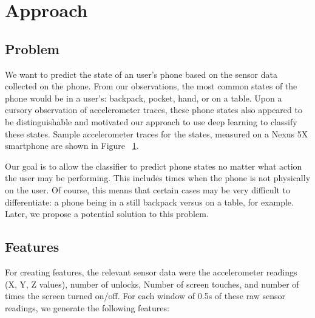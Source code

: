\section{Approach}

\subsection{Problem}
We want to predict the state of an user's phone based on the sensor data collected on the phone. 
From our observations, the most common states of the phone would be in a user's: backpack, pocket, hand, or on a table.
Upon a cursory observation of accelerometer traces, these phone states also appeared to be distinguishable and motivated
our approach to use deep learning to classify these states.
Sample accelerometer traces for the states, measured on a Nexus 5X
smartphone are shown in Figure ~\ref{fig:AccelDiffStates}.

\begin{figure}
\begin{center}
 \scalebox{0.375}{}
  \scalebox{0.375}{}
  \scalebox{0.375}{}
  \scalebox{0.375}{}
  \label{fig:AccelDiffStates}
\end{center}
\end{figure}


Our goal is to allow the classifier to predict phone states no matter what action the user may be performing.
This includes times when the phone is not physically on the user. 
Of course, this means that certain cases may be very difficult to differentiate: a phone being in a still backpack versus on a table, for example.
Later, we propose a potential solution to this problem. 


\subsection{Features}
For creating features, the relevant sensor data were the accelerometer readings (X, Y, Z values), number of unlocks, Number of screen touches, and number of times the screen turned on/off. For each window of 0.5s of these raw sensor readings, we generate the following features:

